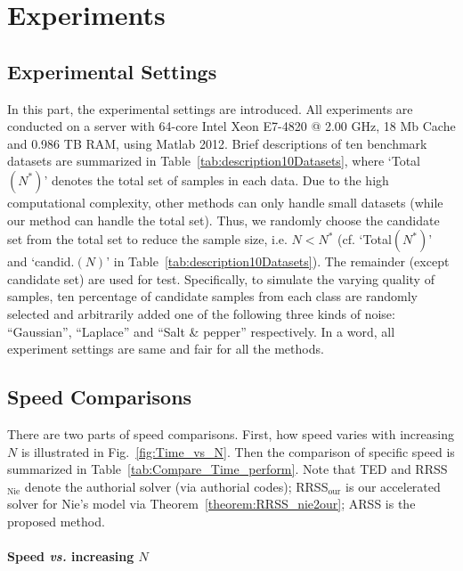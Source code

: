\documentclass[a4paper]{article}
\begin{document}
\section{Experiments}


\subsection{Experimental Settings}

In this part, the experimental settings are introduced. All experiments
are conducted on a server with 64-core Intel Xeon E7-4820 @ 2.00 GHz,
18 Mb Cache and 0.986 TB RAM, using Matlab 2012. Brief descriptions
of ten benchmark datasets are summarized in Table\ \ref{tab:description10Datasets},
where `Total$\left(N^{*}\right)$' denotes the total set of samples
in each data. Due to the high computational complexity, other methods
can only handle small datasets (while our method can handle the total
set). Thus, we randomly choose the candidate set from the total set
to reduce the sample size, i.e. $N<N^{*}$ (cf. `Total$\left(N^{*}\right)$'
and `candid.$\left(N\right)$' in Table\ \ref{tab:description10Datasets}).
The remainder (except candidate set) are used for test. Specifically,
to simulate the varying quality of samples, ten percentage of candidate
samples from each class are randomly selected and arbitrarily added
one of the following three kinds of noise: ``Gaussian'', ``Laplace''
and ``Salt \& pepper'' respectively. In a word, all experiment settings
are same and fair for all the methods. 


\subsection{Speed Comparisons}

There are two parts of speed comparisons. First, how speed varies
with increasing $N$ is illustrated in Fig.\ \ref{fig:Time_vs_N}.
Then the comparison of specific speed is summarized in Table\ \ref{tab:Compare_Time_perform}.
Note that TED and RRSS$_{\text{Nie}}$ denote the authorial solver
(via authorial codes); RRSS$_{\text{our}}$ is our accelerated solver
for Nie's model via Theorem\ \ref{theorem:RRSS_nie2our}; ARSS is
the proposed method.


\paragraph{Speed \emph{vs.} increasing $N$}
\end{document}
